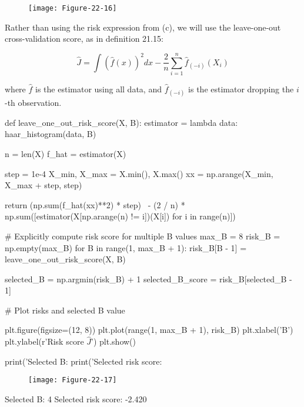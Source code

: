 \begin{figure}[H]
\centering
\texttt{[image: Figure-22-16]}
\end{figure}

Rather than using the risk expression from (c), we will use the
leave-one-out cross-validation score, as in definition 21.15:

\[ \hat{J} = \int \left( \hat{f}(x) \right)^{2} dx - \frac{2}{n} \sum_{i=1}^{n} \hat{f}_{(-i)} (X_{i}) \]

where \(\hat{f}\) is the estimator using all data, and
\(\hat{f}_{(-i)}\) is the estimator dropping the \(i\)-th observation.


\begin{python}
def leave_one_out_risk_score(X, B):
    estimator = lambda data: haar_histogram(data, B)
    
    n = len(X)
    f_hat = estimator(X)
    
    step = 1e-4
    X_min, X_max = X.min(), X.max()
    xx = np.arange(X_min, X_max + step, step)

    return (np.sum(f_hat(xx)**2) * step) \
        - (2 / n) * np.sum([estimator(X[np.arange(n) != i])(X[i]) for i in range(n)])
\end{python}

\begin{python}
# Explicitly compute risk score for multiple B values
max_B = 8
risk_B = np.empty(max_B)
for B in range(1, max_B + 1):
    risk_B[B - 1] = leave_one_out_risk_score(X, B)

selected_B = np.argmin(risk_B) + 1
selected_B_score = risk_B[selected_B - 1]
\end{python}

\begin{python}
# Plot risks and selected B value

plt.figure(figsize=(12, 8))
plt.plot(range(1, max_B + 1), risk_B)
plt.xlabel('B')
plt.ylabel(r'Risk score $\hat{J}$')
plt.show()

print('Selected B: %
print('Selected risk score: %
\end{python}

\begin{figure}[H]
\centering
\texttt{[image: Figure-22-17]}
\end{figure}

\begin{console}
Selected B: 4
Selected risk score: -2.420
\end{console}


